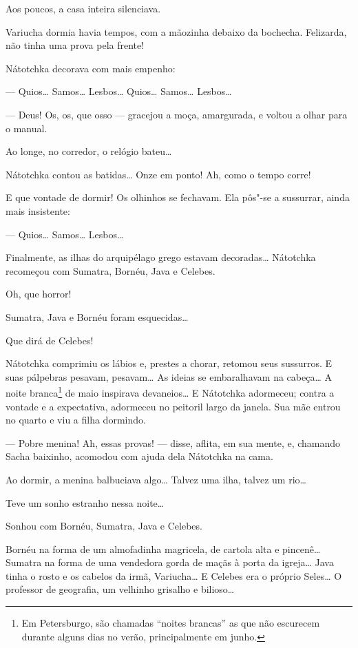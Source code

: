 Aos poucos, a casa inteira silenciava.

Variucha dormia havia tempos, com a mãozinha debaixo da bochecha.
Felizarda, não tinha uma prova pela frente!

Nátotchka decorava com mais empenho:

--- Quios\ldots{} Samos\ldots{} Lesbos\ldots{} Quios\ldots{} Samos\ldots{} Lesbos\ldots{}

--- Deus! Os, os, que osso --- gracejou a moça,
amargurada, e voltou a olhar para o manual.

Ao longe, no corredor, o relógio bateu\ldots{}

Nátotchka contou as batidas\ldots{} Onze em ponto! Ah, como o tempo corre!

E que vontade de dormir! Os olhinhos se fechavam. Ela pôs"-se a
sussurrar, ainda mais insistente:

--- Quios\ldots{} Samos\ldots{} Lesbos\ldots{}

Finalmente, as ilhas do arquipélago grego estavam decoradas\ldots{} Nátotchka
recomeçou com Sumatra, Bornéu, Java e Celebes.

Oh, que horror!

Sumatra, Java e Bornéu foram esquecidas\ldots{}

Que dirá de Celebes!

Nátotchka comprimiu os lábios e, prestes a chorar, retomou seus
sussurros. E suas pálpebras pesavam, pesavam\ldots{} As ideias se
embaralhavam na cabeça\ldots{} A noite branca\footnote{Em Petersburgo, são
  chamadas ``noites brancas'' as que não escurecem durante alguns dias no verão, principalmente em junho.} de maio inspirava devaneios\ldots{} E
Nátotchka adormeceu; contra a vontade e a expectativa, adormeceu no
peitoril largo da janela. Sua mãe entrou no quarto e viu a filha
dormindo.

--- Pobre menina! Ah, essas provas! --- disse, aflita, em sua mente, e,
chamando Sacha baixinho, acomodou com ajuda dela Nátotchka na cama.

Ao dormir, a menina balbuciava algo\ldots{} Talvez uma ilha, talvez um rio\ldots{}

Teve um sonho estranho nessa noite\ldots{}

Sonhou com Bornéu, Sumatra, Java e Celebes.

Bornéu na forma de um almofadinha magricela, de cartola alta e
pincenê\ldots{} Sumatra na forma de uma vendedora gorda de maçãs à porta da
igreja\ldots{} Java tinha o rosto e os cabelos da irmã, Variucha\ldots{} E Celebes
era o próprio Seles\ldots{} O professor de geografia, um velhinho grisalho e
bilioso\ldots{}

